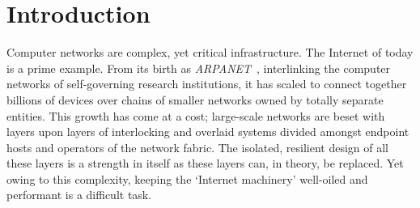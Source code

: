 \chapter{Introduction}\label{chap:intro}


Computer networks are complex, yet critical infrastructure.
The Internet of today is a prime example.
From its birth as \emph{ARPANET}~\parencite{DBLP:conf/afips/HeartKOCW70}, interlinking the computer networks of self-governing research institutions, it has scaled to connect together billions of devices over chains of smaller networks owned by totally separate entities.
This growth has come at a cost; large-scale networks are beset with layers upon layers of interlocking and overlaid systems divided amongst endpoint hosts and operators of the network fabric.
The isolated, resilient design of all these layers is a strength in itself as these layers can, in theory, be replaced.
Yet owing to this complexity, keeping the `Internet machinery' well-oiled and performant is a difficult task.

